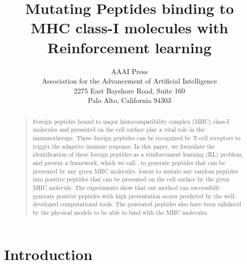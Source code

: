 \documentclass[letterpaper]{article}
\begin{document}
%                                                                                                                                                                                                                                                                                                                
\title{Mutating Peptides binding to MHC class-I molecules with Reinforcement learning}
\author{AAAI Press\\
Association for the Advancement of Artificial Intelligence\\
2275 East Bayshore Road, Suite 160\\
Palo Alto, California 94303\\
}
\maketitle
\begin{abstract}
\begin{quote}
Foreign peptides bound to major histocompatibility complex (MHC) class-I molecules and presented on the cell 
surface play a vital role in the immunotherapy.
%
These foreign peptides can be recognized by T-cell receptors to trigger the adaptive immune response.
%
In this paper, we formulate the identification of these foreign peptides as a reinforcement learning (RL) problem, 
and present a framework, which we call \pepppo, to generate peptides that can be presented by any given MHC molecules.
%
\pepppo learns to mutate any random peptides into positive peptides that can be presented 
on the cell surface by the given MHC molecule.
%
%
The experiments show that our method can successfully generate positive peptides with high 
presentation scores predicted by the well-developed computational tools.
%
The generated peptides also have been validated by the physical models to be able to bind with the MHC molecules.
\end{quote}
\end{abstract}

\section{Introduction}
\label{sec:intro}
\end{document}
